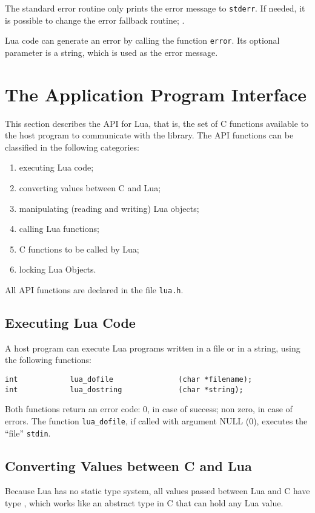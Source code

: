 The standard error routine only prints the error message
to \verb'stderr'.
If needed, it is possible to change the error fallback routine;
.

Lua code can generate an error by calling the function \verb'error'.
Its optional parameter is a string,
which is used as the error message.


\section{The Application Program Interface}

This section describes the API for Lua, that is,
the set of C functions available to the host program to communicate
with the library.
The API functions can be classified in the following categories:
\begin{enumerate}
\item executing Lua code;
\item converting values between C and Lua;
\item manipulating (reading and writing) Lua objects;
\item calling Lua functions;
\item C functions to be called by Lua;
\item locking Lua Objects.
\end{enumerate}
All API functions are declared in the file \verb'lua.h'.

\subsection{Executing Lua Code}
A host program can execute Lua programs written in a file or in a string,
using the following functions:
\begin{verbatim}
int            lua_dofile               (char *filename);
int            lua_dostring             (char *string);
\end{verbatim}
Both functions return an error code:
0, in case of success; non zero, in case of errors.
The function \verb'lua_dofile', if called with argument NULL (0),
executes the ``file'' {\tt stdin}.

\subsection{Converting Values between C and Lua} \label{valuesCLua}
Because Lua has no static type system,
all values passed between Lua and C have type ,
which works like an abstract type in C that can hold any Lua value.

